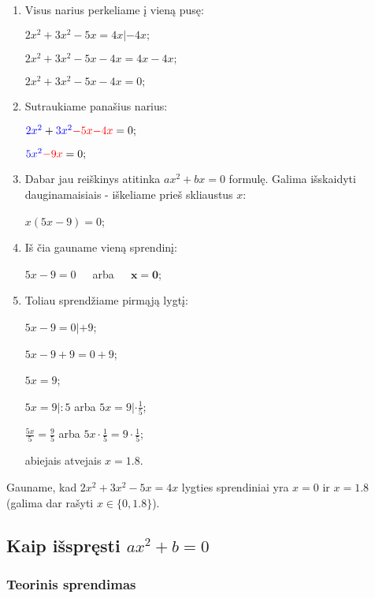 \documentclass[a4paper]{article}
\begin{document}
\begin{enumerate}
      \item Visus narius perkeliame į vieną pusę:

            $ 2x^2 + 3x^2 - 5x = 4x | - 4x; $

            $ 2x^2 + 3x^2 - 5x - 4x = 4x - 4x; $

            $ 2x^2 + 3x^2 - 5x - 4x = 0; $

      \item Sutraukiame panašius narius:

            $ \textcolor{blue}{2x^2} + \textcolor{blue}{3x^2} \textcolor{red}{-
                        5x} \textcolor{red}{- 4x} = 0; $

            $ \textcolor{blue}{5x^2} \textcolor{red}{- 9x} = 0; $

      \item Dabar jau reiškinys atitinka $ ax^{2}+ bx = 0 $ formulę. Galima
            išskaidyti dauginamaisiais - iškeliame prieš skliaustus $ x $:

            $ x(5x - 9) = 0 $;

      \item Iš čia gauname vieną sprendinį:

            $ 5x-9 = 0 $ $\;\;\;$ arba $\;\;\;$ $ \boldsymbol{x=0} $;

      \item Toliau sprendžiame pirmąją lygtį:

            $ 5x-9 = 0 | + 9 $;

            $ 5x-9+9 = 0+9 $;

            $ 5x = 9 $;

            $ 5x = 9|:5 $ arba $ 5x = 9|\cdot \frac{1}{5}$;

            $ \frac{5x}{5} = \frac{9}{5} $ arba $ 5x\cdot\frac{1}{5} = 9\cdot
                  \frac{1}{5}$;

            abiejais atvejais $ x = 1.8 $.

\end{enumerate}

Gauname, kad $ 2x^2 + 3x^2 - 5x = 4x $ lygties sprendiniai yra $x=0$ ir $ x =
      1.8 $ (galima dar rašyti $ x \in \{0, 1.8\} $).

\subsection{Kaip išspręsti $ ax^{2}+b=0 $}

\subsubsection{Teorinis sprendimas}
\end{document}
